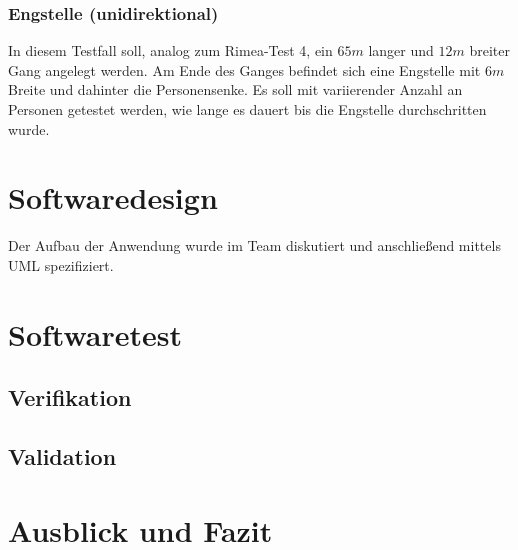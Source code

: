 \subsubsection{Engstelle (unidirektional)}
In diesem Testfall soll, analog zum Rimea-Test 4, ein $65m$ langer und $12m$ breiter Gang angelegt werden. Am Ende des Ganges befindet sich eine Engstelle mit $6m$ Breite und dahinter die Personensenke. Es soll mit variierender Anzahl an Personen getestet werden, wie lange es dauert bis die Engstelle durchschritten wurde.

\section{Softwaredesign}

Der Aufbau der Anwendung wurde im Team diskutiert und anschließend mittels UML spezifiziert.


\section{Softwaretest}

\subsection{Verifikation}

\subsection{Validation}

\section{Ausblick und Fazit}

%




